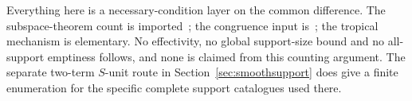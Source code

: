 \begin{remark}[Scope]
Everything here is a necessary-condition layer on the common difference.
The subspace-theorem count is imported~\cite{ESS02}; the congruence input
is~\cite{PTZ15}; the tropical mechanism is elementary. No effectivity, no
global support-size bound and no all-support emptiness follows, and none is
claimed from this counting argument. The separate two-term $S$-unit route
in Section~\ref{sec:smoothsupport} does give a finite enumeration for the
specific complete support catalogues used there.
\end{remark}
